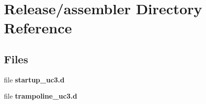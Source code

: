 \section{Release/assembler Directory Reference}
\label{dir_041cef2e45b06fa05270f0a9c1604755}
\subsection*{Files}
\begin{DoxyCompactItemize}
\item 
file {\bfseries startup\+\_\+uc3.\+d}
\item 
file {\bfseries trampoline\+\_\+uc3.\+d}
\end{DoxyCompactItemize}
